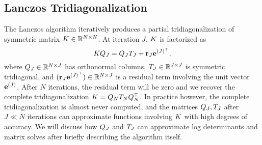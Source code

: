 

\subsection{Lanczos Tridiagonalization}
\label{sec:lanczos}

The Lanczos algorithm \cite{lanczos1950iteration} iteratively produces a partial tridiagonalization of symmetric matrix $K \in \mathbb{R}^{N \times N}$.
At iteration $J$, $K$ is factorized as
%
\begin{equation}
  K Q_J = Q_J T_J + \mathbf{r}_J \mathbf{e}^{(J)^\top},
  \label{eqn:lanczos}
\end{equation}
%
where $Q_J \in \mathbb{R}^{N \times J}$ has orthonormal columns, $T_J \in \mathbb{R}^{J \times J}$ is symmetric tridiagonal, and $(\mathbf{r}_J \mathbf{e}^{(J)^\top}) \in \mathbb{R}^{N \times J}$ is a residual term involving the unit vector $\mathbf{e}^{(J)}$.
After $N$ iterations, the residual term will be zero and we recover the complete tridiagonalization $K = Q_N T_N Q^\top_N$.
In practice however, the complete tridiagonalization is almost never computed, and the matrices $Q_J, T_J$ after $J \ll N$ iterations can approximate functions involving $K$ with high degrees of accuracy.
We will discuss how $Q_J$ and $T_J$ can approximate log determinants and matrix solves after briefly describing the algorithm itself.

